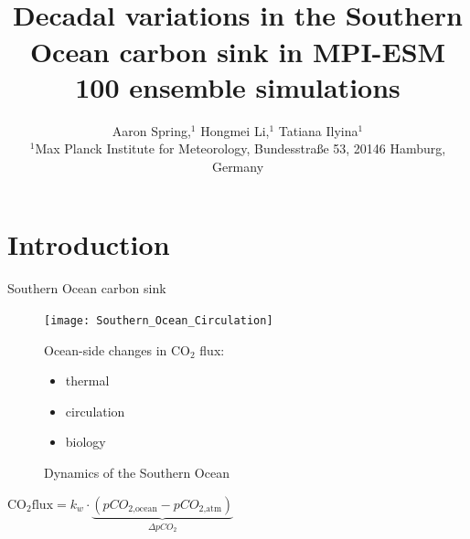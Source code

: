 \documentclass[aspectratio=169]{beamer}
\title{\vspace{5mm} \\ Decadal variations in the Southern Ocean carbon sink in MPI-ESM 100 ensemble simulations}%
\subtitle{ \vspace{1cm} Aaron Spring,$^{1}$ Hongmei Li,$^{1}$ Tatiana Ilyina$^{1}$
\\ \normalsize{$^{1}$Max Planck Institute for Meteorology, Bundesstra{\ss}e 53, 20146 Hamburg, Germany}
}
\begin{document}
\begin{frame}[noframenumbering]
	\titlepage
\end{frame}

\section{Introduction}

\begin{frame}{Southern Ocean carbon sink}%

\begin{figure}[h]
	\begin{minipage}{.5\textwidth}
		\centering
			\texttt{[image: Southern\_Ocean\_Circulation]}
\vspace{-2mm}
	\caption{Dynamics of the Southern Ocean \citep{Morrison2015}}
		\label{fig:SO_review}
	\end{minipage} \hfill
	\begin{minipage}{.25\textwidth}

		Ocean-side changes in CO$_2$ flux:		
		\begin{itemize}
			\item thermal
			\item circulation
			\item biology
		\end{itemize}
		\hspace{-1cm}
	
		
	\end{minipage}
\end{figure}
\vspace{-12mm}

\begin{flushright}
$\text{CO}_2\text{flux}=k_w \cdot  \underbrace{\left( pCO_\text{2,ocean} - pCO_\text{2,atm}\right)}_{\Delta pCO_2}	$
\end{flushright}

\end{frame}
\end{document}
